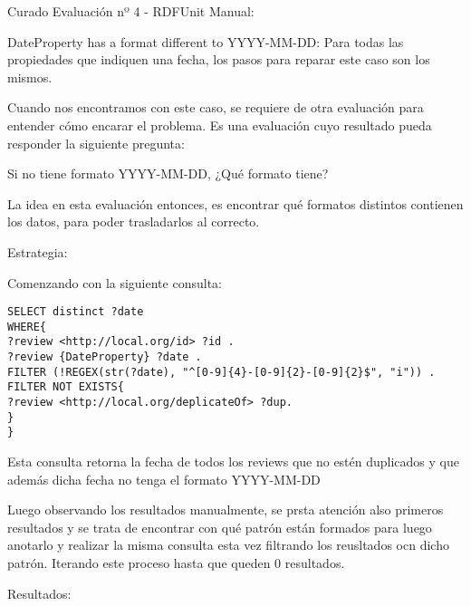 Curado Evaluación nº 4 - RDFUnit Manual:

{DateProperty} has a format different to YYYY-MM-DD:
Para todas las propiedades que indiquen una fecha, los pasos para reparar este caso son los mismos.

Cuando nos encontramos con este caso, se requiere de otra evaluación para entender cómo encarar el problema. Es una evaluación cuyo resultado
pueda responder la siguiente pregunta:

Si no tiene formato YYYY-MM-DD, ¿Qué formato tiene?

La idea en esta evaluación entonces, es encontrar qué formatos distintos contienen los datos, para poder trasladarlos al correcto.

Estrategia:

Comenzando con la siguiente consulta:


\begin{lstlisting}[frame=single]  
SELECT distinct ?date 
WHERE{
?review <http://local.org/id> ?id .
?review {DateProperty} ?date .
FILTER (!REGEX(str(?date), "^[0-9]{4}-[0-9]{2}-[0-9]{2}$", "i")) .
FILTER NOT EXISTS{
?review <http://local.org/deplicateOf> ?dup.
}
}
\end{lstlisting}



Esta consulta retorna la fecha de todos los reviews que no estén duplicados y que además dicha fecha no tenga el formato YYYY-MM-DD

Luego observando los resultados manualmente, se prsta atención also primeros resultados y se trata de encontrar con qué patrón están formados 
para luego anotarlo y realizar la misma consulta esta vez filtrando los reusltados ocn dicho patrón. Iterando este proceso hasta que 
queden 0 resultados.

Resultados:


